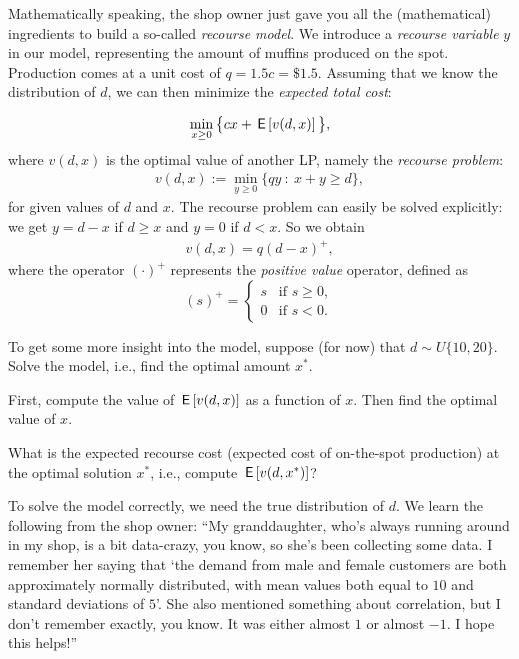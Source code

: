Mathematically speaking, the shop owner just gave you all the (mathematical) ingredients to build a so-called \textit{recourse model}. We introduce a \textit{recourse variable} $y$ in our model, representing the amount of muffins produced on the spot. Production comes at a unit cost of $q = 1.5 c = \$ 1.5$. Assuming that we know the distribution of $d$, we can then minimize the \textit{expected total cost}:

\begin{align}
    \min_{x \geq 0} \big\{ cx + \,\mathsf{E}\left[v(d,x)\right] \big\},
\end{align}
where $v(d,x)$ is the optimal value of another LP, namely the \textit{recourse problem}:
\begin{align}
    v(d,x) := \min_{y \geq 0} \{ qy \ : \ x + y \geq d \},
\end{align}
for given values of $d$ and $x$. The recourse problem can easily be solved explicitly: we get $y=d-x$ if $d \geq x$ and $y=0$ if $d < x$. So we obtain
\begin{align}
    v(d,x) = q (d - x)^+,
\end{align}
where the operator $(\cdot)^+$ represents the \textit{positive value} operator, defined as
\begin{equation}
    (s)^+ = \begin{cases}
    s &\text{if } s \geq 0,\\
    0 &\text{if } s < 0.
    \end{cases}
\end{equation}

\begin{exercise}
To get some more insight into the model, suppose (for now) that $d \sim U\{10, 20\}$.
Solve the model, i.e., find the optimal amount $x^*$.
\begin{hint}
First, compute the value of $\,\mathsf{E}\left[v(d,x)\right]$ as a function of $x$. Then find the optimal value of $x$.
\end{hint}
\end{exercise}

\begin{exercise}
 What is the expected recourse cost (expected cost of on-the-spot production) at the optimal solution $x^*$, i.e., compute $\,\mathsf{E}\left[v(d,x^*)\right]$?
\end{exercise}

To solve the model correctly, we need the true distribution of $d$. We learn the following from the shop owner: ``My granddaughter, who's always running around in my shop, is a bit data-crazy, you know, so she's been collecting some data. I remember her saying that `the demand from male and female customers are both approximately normally distributed, with mean values both equal to $10$ and standard deviations of $5$'. She also mentioned something about correlation, but I don't remember exactly, you know. It was either almost $1$ or almost $-1$. I hope this helps!''

